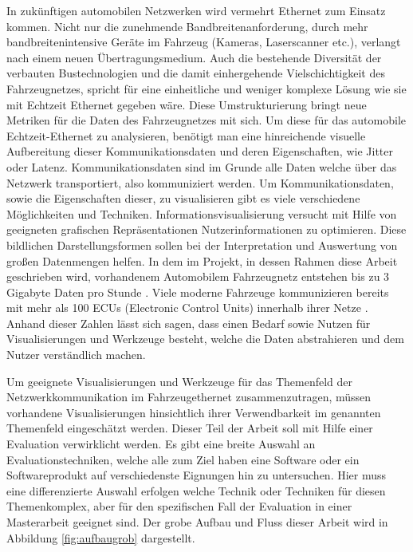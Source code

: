 \documentclass[draft=false
              ,paper=a4
              ,twoside=false
              ,fontsize=11pt
              ,headsepline
              ,BCOR10mm
              ,DIV11
              ]{scrbook}
\newcommand{\TODO}[1]{\colorbox{yellow}{\textcolor{red}{[TODO: #1]}}}
\begin{document}
In zukünftigen automobilen Netzwerken wird vermehrt Ethernet zum Einsatz kommen. Nicht nur die zunehmende Bandbreitenanforderung, durch mehr bandbreitenintensive Geräte im Fahrzeug (Kameras, Laserscanner etc.), verlangt nach einem neuen Übertragungsmedium. Auch die bestehende Diversität der verbauten Bustechnologien und die damit einhergehende Vielschichtigkeit des Fahrzeugnetzes, spricht für eine einheitliche und weniger komplexe Lösung wie sie mit Echtzeit Ethernet gegeben wäre. Diese Umstrukturierung bringt neue Metriken für die Daten des Fahrzeugnetzes mit sich. Um diese für das automobile Echtzeit-Ethernet zu analysieren, benötigt man eine hinreichende visuelle Aufbereitung dieser Kommunikationsdaten und deren Eigenschaften, wie Jitter oder Latenz. Kommunikationsdaten sind im Grunde alle Daten welche über das Netzwerk transportiert, also kommuniziert werden. Um Kommunikationsdaten, sowie die Eigenschaften dieser, zu visualisieren gibt es viele verschiedene Möglichkeiten und Techniken. Informationsvisualisierung versucht mit Hilfe von geeigneten grafischen Repräsentationen Nutzerinformationen zu optimieren. Diese bildlichen Darstellungsformen sollen bei der Interpretation und Auswertung von großen Datenmengen helfen. In dem im Projekt, in dessen Rahmen diese Arbeit geschrieben wird, vorhandenem Automobilem Fahrzeugnetz entstehen bis zu 3 Gigabyte Daten pro Stunde \cite{core_2017}. Viele moderne Fahrzeuge kommunizieren bereits mit mehr als 100 ECUs (Electronic Control Units) innerhalb ihrer Netze \cite{broy_cross-layer_2011}. Anhand dieser Zahlen lässt sich sagen, dass einen Bedarf sowie Nutzen für Visualisierungen und Werkzeuge besteht, welche die Daten abstrahieren und dem Nutzer verständlich machen.

Um geeignete Visualisierungen und Werkzeuge für das Themenfeld der Netzwerkkommunikation im Fahrzeugethernet zusammenzutragen, müssen vorhandene Visualisierungen hinsichtlich ihrer Verwendbarkeit im genannten Themenfeld eingeschätzt werden. Dieser Teil der Arbeit soll mit Hilfe einer Evaluation verwirklicht werden. Es gibt eine breite Auswahl an Evaluationstechniken, welche alle zum Ziel haben eine Software oder ein Softwareprodukt auf verschiedenste Eignungen hin zu untersuchen. Hier muss eine differenzierte Auswahl erfolgen welche Technik oder Techniken für diesen Themenkomplex, aber für den spezifischen Fall der Evaluation in einer Masterarbeit geeignet sind. Der grobe Aufbau und Fluss dieser Arbeit wird in Abbildung \ref{fig:aufbaugrob} dargestellt. 
\end{document}
